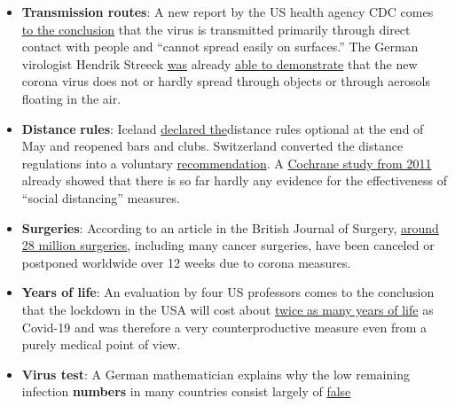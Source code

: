 \begin{itemize}
\tightlist
\item
  \textbf{Transmission routes}: A new report by the US health agency CDC
  comes
  \href{https://www.yahoo.com/lifestyle/cdc-coronavirus-mainly-spreads-through-persontoperson-contact-and-does-not-spread-easily-on-contaminated-surfaces-153317029.html}{to
  the conclusion} that the virus is transmitted primarily through direct
  contact with people and ``cannot spread easily on surfaces.'' The
  German virologist Hendrik Streeck
  \href{https://www.telegraph.co.uk/news/2020/04/02/no-proof-coronavirus-can-spread-shopping-says-leading-german/}{was}
  already
  \href{https://www.telegraph.co.uk/news/2020/04/02/no-proof-coronavirus-can-spread-shopping-says-leading-german/}{able
  to demonstrate} that the new corona virus does not or hardly spread
  through objects or through aerosols floating in the air.
\item
  \textbf{Distance} \textbf{rules}: Iceland
  \href{https://icelandmonitor.mbl.is/news/news/2020/05/25/two_meter_rule_optional_in_iceland/}{declared
  the}distance rules optional at the end of May and reopened bars and
  clubs. Switzerland converted the distance regulations into a voluntary
  \href{https://www.20min.ch/story/bund-schafft-die-2-meter-abstands-busse-heimlich-ab-763738047957}{recommendation}.
  A
  \href{https://www.cochranelibrary.com/cdsr/doi/10.1002/14651858.CD006207.pub4/full}{Cochrane
  study from 2011} already showed that there is so far hardly any
  evidence for the effectiveness of ``social distancing'' measures.
\item
  \textbf{Surgeries}: According to an article in the British Journal of
  Surgery,
  \href{https://bjssjournals.onlinelibrary.wiley.com/doi/abs/10.1002/bjs.11746}{around
  28 million surgeries}, including many cancer surgeries, have been
  canceled or postponed worldwide over 12 weeks due to corona measures.
\item
  \textbf{Years of life}: An evaluation by four US professors comes to
  the conclusion that the lockdown in the USA will cost about
  \href{https://thehill.com/opinion/healthcare/499394-the-covid-19-shutdown-will-cost-americans-millions-of-years-of-life}{twice
  as many years of life} as Covid-19 and was therefore a very
  counterproductive measure even from a purely medical point of view.
\item
  \textbf{Virus test}: A German mathematician explains why the low
  remaining infection \textbf{numbers} in many countries consist largely
  of
  \href{https://multipolar-magazin.de/artikel/warum-die-pandemie-nicht-endet}{false
}
\end{itemize}
